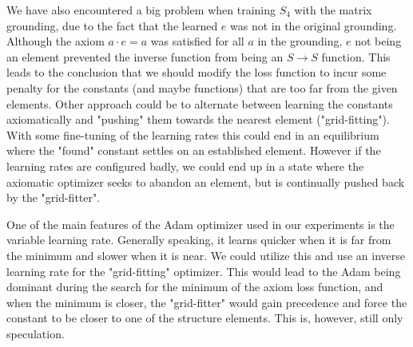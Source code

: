 We have also encountered a big problem when training $S_4$ with the matrix grounding, due to the fact that the learned $e$ was not in the original grounding. Although the axiom $a\cdot e=a$ was satisfied for all $a$ in the grounding, $e$ not being an element prevented the inverse function from being an $S\rightarrow S$ function. This leads to the conclusion that we should modify the loss function to incur some penalty for the constants (and maybe functions) that are too far from the given elements. Other approach could be to alternate between learning the constants axiomatically and "pushing" them towards the nearest element ("grid-fitting"). With some fine-tuning of the learning rates this could end in an equilibrium where the "found" constant settles on an established element. However if the learning rates are configured badly, we could end up in a state where the axiomatic optimizer seeks to abandon an element, but is continually pushed back by the "grid-fitter".

One of the main features of the Adam optimizer used in our experiments is the variable learning rate. Generally speaking, it learns quicker when it is far from the minimum and slower when it is near. We could utilize this and use an inverse learning rate for the "grid-fitting" optimizer. This would lead to the Adam being dominant during the search for the minimum of the axiom loss function, and when the minimum is closer, the "grid-fitter" would gain precedence and force the constant to be closer to one of the structure elements. This is, however, still only speculation.